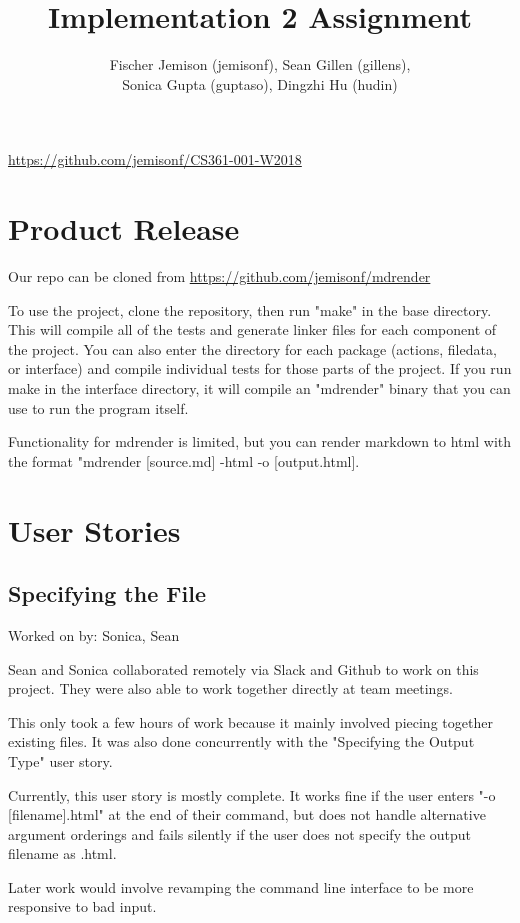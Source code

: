 \documentclass[12pt]{article}
\title{Implementation 2 Assignment}
\author{Fischer Jemison (jemisonf), Sean Gillen (gillens), \\
Sonica Gupta (guptaso), Dingzhi Hu (hudin) }
\begin{document}
\maketitle
\centerline{\url{https://github.com/jemisonf/CS361-001-W2018}}
\tableofcontents

\section{Product Release}

Our repo can be cloned from \url{https://github.com/jemisonf/mdrender}

To use the project, clone the repository, then run "make" in the base directory. This will compile all of the tests and generate linker files for each component of the project. You can also enter the directory for each package (actions, filedata, or interface) and compile individual tests for those parts of the project. If you run make in the interface directory, it will compile an "mdrender" binary that you can use to run the program itself.

Functionality for mdrender is limited, but you can render markdown to html with the format "mdrender [source.md] -html -o [output.html]. \section{User Stories}

\subsection{Specifying the File}

Worked on by: Sonica, Sean

Sean and Sonica collaborated remotely via Slack and Github to work on this project. They were also able to work together directly at team meetings.

This only took a few hours of work because it mainly involved piecing together existing files. It was also done concurrently with the "Specifying the Output Type" user story.

Currently, this user story is mostly complete. It works fine if the user enters "-o [filename].html" at the end of their command, but does not handle alternative argument orderings and fails silently if the user does not specify the output filename as .html.

Later work would involve revamping the command line interface to be more responsive to bad input.
\end{document}
